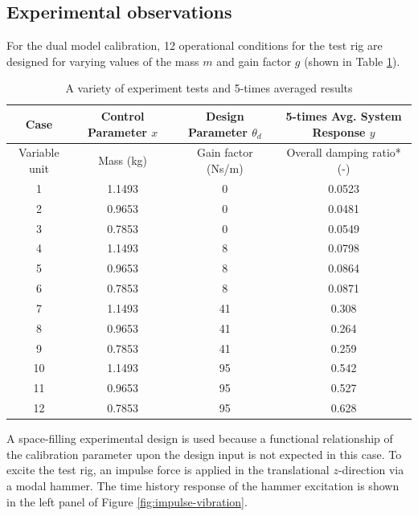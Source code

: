 \documentclass[10pt]{asme2ej}
\begin{document}
\subsection{Experimental observations}
%
For the dual model calibration, 12 operational conditions for the test rig are designed for varying values of the mass $m$ and gain factor $g$ (shown in Table \ref{table:exp}). 
%
\begin{table}
	\centering
	\captionsetup{width=.85\linewidth}
	\caption{A variety of experiment tests and 5-times averaged results} 
	\renewcommand{\arraystretch}{1.2}%
	\begin{tabular}{c|ccc}
		\hline
		Case&
		Control Parameter $x$&Design Parameter $\theta_d$&5-times Avg. System Response $y$\\
		\hline\hline
		Variable unit&Mass (kg)& Gain factor (Ns/m)&Overall damping ratio* (-)\\
		\hline
		1&1.1493&0&0.0523\\
		2&0.9653&0&0.0481\\
		3&	0.7853&	0&	0.0549\\
		4&	1.1493&	8&	0.0798\\
		5&	0.9653&	8&	0.0864\\
		6&	0.7853&	8&	0.0871\\
		7&	1.1493&	41&	0.308\\
		8&	0.9653&	41&	0.264\\
		9&	0.7853&	41&	0.259\\
		10&	1.1493&	95&	0.542\\
		11&	0.9653&	95&	0.527\\
		12&	0.7853&	95&	0.628\\
		\hline
	\end{tabular}
	\label{table:exp}
\end{table}
%
A space-filling experimental design is used because a functional relationship of the calibration parameter upon the design input is not expected in this case.
%
To excite the test rig, an impulse force is applied in the translational $z$-direction via a modal hammer. 
%
The time history response of the hammer excitation is shown in the left panel of Figure \ref{fig:impulse-vibration}. 
%
\end{document}
